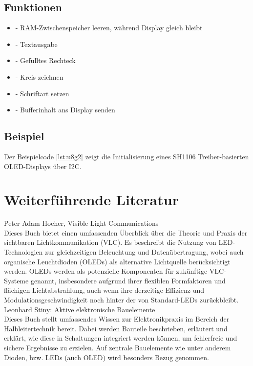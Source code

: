 \subsection{Funktionen}

\begin{itemize}
    \item {} - RAM-Zwischenspeicher leeren, während Display gleich bleibt
    \item {} - Textausgabe
    \item {} -  Gefülltes Rechteck
    \item {} - Kreis zeichnen
    \item {} - Schriftart setzen
    \item {} - Bufferinhalt ans Display senden
\end{itemize}



\subsection{Beispiel}
Der Beispielcode \ref{lst:u8g2} zeigt die Initialisierung eines SH1106 Treiber-basierten OLED-Displays über I2C. 

{
    \label{lst:u8g2}
}


\section{Weiterführende Literatur}

Peter Adam Hoeher, Visible Light Communications \cite{hoeher_visible_2019}\\


Dieses Buch bietet einen umfassenden Überblick über die Theorie und Praxis der sichtbaren Lichtkommunikation (VLC). Es beschreibt die Nutzung von LED-Technologien zur gleichzeitigen Beleuchtung und Datenübertragung, wobei auch organische Leuchtdioden (OLEDs) als alternative Lichtquelle berücksichtigt werden. OLEDs werden als potenzielle Komponenten für zukünftige VLC-Systeme genannt, insbesondere aufgrund ihrer flexiblen Formfaktoren und flächigen Lichtabstrahlung, auch wenn ihre derzeitige Effizienz und Modulationsgeschwindigkeit noch hinter der von Standard-LEDs zurückbleibt.\\


Leonhard Stiny: Aktive elektronische Bauelemente \cite{Stiny:2019}\\



Dieses Buch stellt umfassendes Wissen zur Elektronikpraxis im Bereich der Halbleitertechnik bereit. Dabei werden Bauteile beschrieben, erläutert und erklärt, wie diese
in Schaltungen integriert werden können, um fehlerfreie und sichere Ergebnisse zu
erzielen. Auf zentrale Bauelemente wie unter anderem Dioden, bzw. LEDs (auch OLED) wird besonders Bezug genommen.